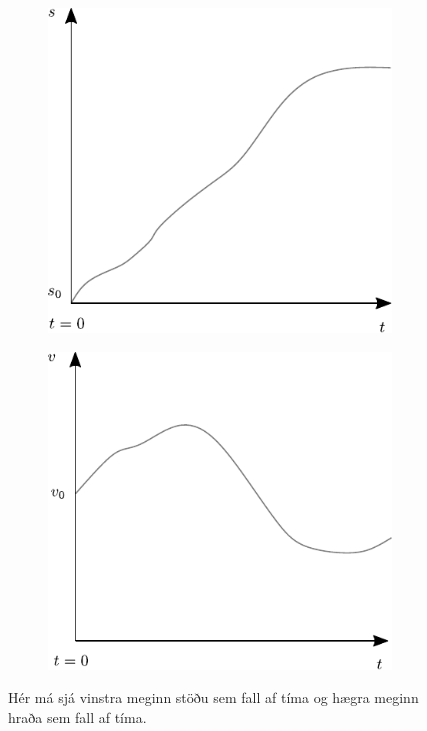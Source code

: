 \begin{figure}[H]
    \centering
\begin{subfigure}[h]{0.4\textwidth}
    \centering
    \includegraphics[width=\linewidth]{figures/stodutimagraf.pdf}
    \label{fig:stgraph}
\end{subfigure}
\hfill
\begin{subfigure}[h]{0.4\textwidth}
    \centering
    \includegraphics[width=\linewidth]{figures/hradatimagraf.pdf}
    \label{fig:vtgraph}
\end{subfigure}
\caption{Hér má sjá vinstra meginn stöðu sem fall af tíma og hægra meginn hraða sem fall af tíma.}
\end{figure}

